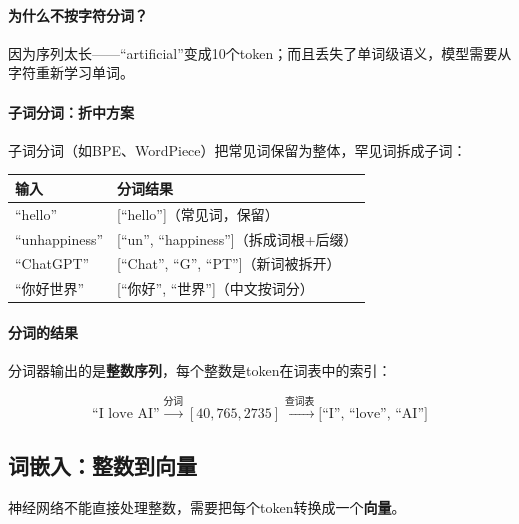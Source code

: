 \paragraph{为什么不按字符分词？}

因为序列太长——“artificial”变成10个token；而且丢失了单词级语义，模型需要从字符重新学习单词。

\paragraph{子词分词：折中方案}

子词分词（如BPE、WordPiece）把常见词保留为整体，罕见词拆成子词：

\begin{center}
\begin{tabular}{ll}
\toprule
输入 & 分词结果 \\
\midrule
“hello” & [“hello”]（常见词，保留） \\
“unhappiness” & [“un”, “happiness”]（拆成词根+后缀） \\
“ChatGPT” & [“Chat”, “G”, “PT”]（新词被拆开） \\
“你好世界” & [“你好”, “世界”]（中文按词分） \\
\bottomrule
\end{tabular}
\end{center}


\paragraph{分词的结果}

分词器输出的是\textbf{整数序列}，每个整数是token在词表中的索引：

\begin{equation}
    \text{“I love AI”} \xrightarrow{\text{分词}} [40, 765, 2735] \xrightarrow{\text{查词表}} \text{[“I”, “love”, “AI”]}
\end{equation}

\subsection{词嵌入：整数到向量}

神经网络不能直接处理整数，需要把每个token转换成一个\textbf{向量}。

